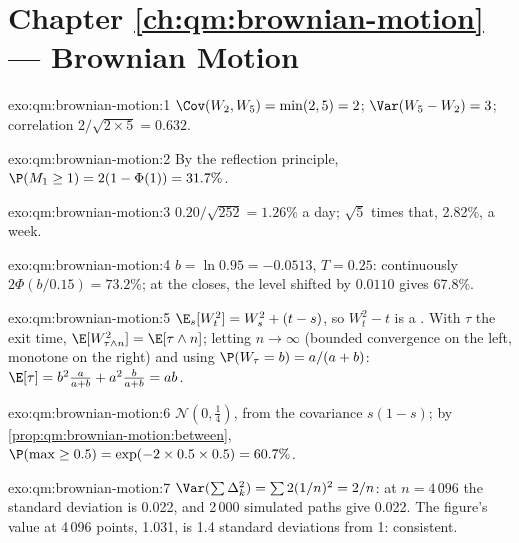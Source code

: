 \section*{Chapter \ref{ch:qm:brownian-motion} --- Brownian Motion}

\begin{solution}{exo:qm:brownian-motion:1}
$\Cov(W_2, W_5) = \min(2,5) = 2$; $\Var(W_5 - W_2) = 3$; correlation $2/\sqrt{2 \times 5} = 0.632$.
\end{solution}

\begin{solution}{exo:qm:brownian-motion:2}
By the reflection principle, $\P(M_1 \ge 1) = 2(1 - \Phi(1)) = 31.7\%$.
\end{solution}

\begin{solution}{exo:qm:brownian-motion:3}
$0.20/\sqrt{252} = 1.26\%$ a day; $\sqrt5$ times that, 2.82\%, a week.
\end{solution}

\begin{solution}{exo:qm:brownian-motion:4}
$b = \ln 0.95 = -0.0513$, $T = 0.25$: continuously $2\Phi(b/0.15) = 73.2\%$; at the closes, the
level shifted by $0.0110$ gives 67.8\%.
\end{solution}

\begin{solution}{exo:qm:brownian-motion:5}
$\E_s[W_t^2] = W_s^2 + (t - s)$, so $W_t^2 - t$ is a . With $\tau$ the exit time,
$\E[W_{\tau\wedge n}^2] = \E[\tau \wedge n]$; letting $n \to \infty$ (bounded convergence on the
left, monotone on the right) and using $\P(W_\tau = b) = a/(a+b)$: $\E[\tau] = b^2\frac{a}{a+b} +
a^2\frac{b}{a+b} = ab$.
\end{solution}

\begin{solution}{exo:qm:brownian-motion:6}
$\mathcal N(0, \tfrac14)$, from the covariance $s(1 - s)$; by
\cref{prop:qm:brownian-motion:between}, $\P(\max \ge 0.5) = \exp(-2 \times 0.5 \times 0.5) = 60.7\%$.
\end{solution}

\begin{solution}{exo:qm:brownian-motion:7}
$\Var(\sum\Delta_k^2) = \sum 2(1/n)^2 = 2/n$: at $n = 4\,096$ the standard deviation is 0.022, and
2\,000 simulated paths give 0.022. The figure's value at 4\,096 points, 1.031, is 1.4 standard
deviations from 1: consistent.
\end{solution}


